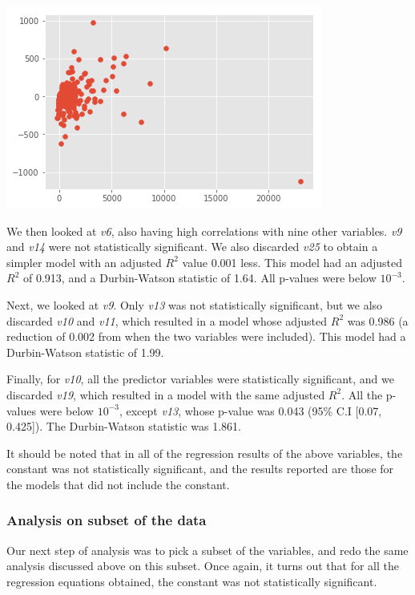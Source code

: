 \documentclass[smallextended]{svjour3}
\begin{document}
	\includegraphics[scale=0.5]{fig3.png}
	\begingroup
	\endgroup
	\hfill\break
	
	We then looked at \textit{v6}, also having high correlations with nine other variables. \textit{v9} and \textit{v14} were not statistically significant. We also discarded \textit{v25} to obtain a simpler model with an adjusted $R^2$ value 0.001 less. This model had an adjusted $R^2$ of 0.913, and a Durbin-Watson statistic of 1.64. All p-values were below $10^{-3}$.
	
	Next, we looked at \textit{v9}. Only \textit{v13} was not statistically significant, but we also discarded \textit{v10} and \textit{v11}, which resulted in a model whose adjusted $R^2$ was 0.986 (a reduction of 0.002 from when the two variables were included). This model had a Durbin-Watson statistic of 1.99.
	
	Finally, for \textit{v10}, all the predictor variables were statistically significant, and we discarded \textit{v19}, which resulted in a model with the same adjusted $R^2$. All the p-values were below $10^{-3}$, except \textit{v13}, whose p-value was 0.043 (95\% C.I [0.07, 0.425]). The Durbin-Watson statistic was 1.861.
	
	It should be noted that in all of the regression results of the above variables, the constant was not statistically significant, and the results reported are those for the models that did not include the constant.
	
	\subsubsection{Analysis on subset of the data}
	Our next step of analysis was to pick a subset of the variables, and redo the same analysis discussed above on this subset. Once again, it turns out that for all the regression equations obtained, the constant was not statistically significant.
	
\end{document}
